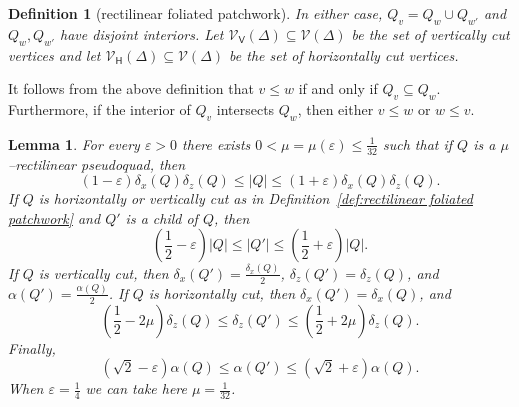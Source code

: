 \documentclass[11pt,reqno]{amsart}
\newcommand{\cV}{\mathcal{V}}
\renewcommand{\epsilon}{\varepsilon}
\newcommand{\e}{\varepsilon}
\newcommand{\0}{\mathbf{0}}
\renewcommand{\1}{\mathbf 1}
\renewcommand{\subset}{\subseteq}
\renewcommand{\le}{\leqslant}
\newtheorem{lemma}[thm]{Lemma}
\newtheorem{defn}[thm]{Definition}
\theoremstyle{remark}
\newcommand{\cVv}{{\mathcal{V}_{\mathsf{V}}}}
\newcommand{\cVh}{{\mathcal{V}_{\mathsf{H}}}}
\begin{document}
\begin{defn}[rectilinear foliated patchwork]
  In either case, $Q_v=Q_{w}\cup Q_{w'}$ and $Q_w, Q_{w'}$ have disjoint interiors.  Let \(\cVv(\Delta)\subset \cV(\Delta)\) be the set of vertically cut vertices and let \(\cVh(\Delta)\subset \cV(\Delta)\) be the set of horizontally cut vertices.
\end{defn}

It follows from the above definition that $v\le w$ if and only if $Q_v\subset Q_w$.  Furthermore, if the interior of $Q_v$ intersects $Q_w$, then either $v\le w$ or $w\le v$.

\begin{lemma}\label{lem:soft cut props}
  For every $\e>0$ there exists $0<\mu=\mu(\e)\le \frac{1}{32}$ such that if $Q$ is a $\mu$--rectilinear pseudoquad, then
  \begin{equation}\label{eq:soft cut area}
    (1-\epsilon) \delta_x(Q) \delta_z(Q) \le |Q|\le (1+\epsilon) \delta_x(Q)  \delta_z(Q).
  \end{equation}
  If $Q$ is horizontally or vertically cut as in Definition~\ref{def:rectilinear foliated patchwork} and $Q'$ is a child of $Q$, then
  \begin{equation}\label{eq:soft cut split}
    \left(\frac{1}{2}-\epsilon\right) |Q|\le |Q'| \le \left(\frac{1}{2}+\epsilon\right) |Q|.
  \end{equation}
  If $Q$ is vertically cut, then $\delta_x(Q')=\frac{\delta_x(Q)}{2}$, $\delta_z(Q')=\delta_z(Q)$, and $\alpha(Q')=\frac{\alpha(Q)}{2}$.
  If $Q$ is horizontally cut, then $\delta_x(Q')=\delta_x(Q)$, and
  \begin{equation}\label{eq:soft horiz cut height}
    \left(\frac{1}{2}-2\mu \right)\delta_z(Q)\le  \delta_z(Q') \le \left(\frac{1}{2}+2\mu \right)\delta_z(Q).
  \end{equation}
Finally,
  \begin{equation}\label{eq:soft cut alpha}
    \left(\sqrt{2}-\epsilon\right)\alpha(Q) \le \alpha(Q') \le \left(\sqrt{2}+\epsilon\right)\alpha(Q).
  \end{equation}
  When $\epsilon=\frac{1}{4}$ we can take here $\mu=\frac{1}{32}$.
\end{lemma}
\end{document}
